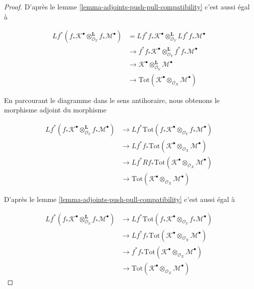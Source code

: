 {\begin{proof}
D'après le lemme \ref{lemma-adjoints-push-pull-compatibility} c'est aussi égal à

\begin{align*}
Lf^*(f_*\mathcal{K}^\bullet
\otimes_{\mathcal{O}_Y}^\mathbf{L}
f_*\mathcal{M}^\bullet)
& =
Lf^*f_*\mathcal{K}^\bullet
\otimes_{\mathcal{O}_Y}^\mathbf{L}
Lf^*f_*\mathcal{M}^\bullet \\
& \to
f^*f_*\mathcal{K}^\bullet
\otimes_{\mathcal{O}_Y}^\mathbf{L}
f^*f_*\mathcal{M}^\bullet \\
& \to
\mathcal{K}^\bullet
\otimes_{\mathcal{O}_Y}^\mathbf{L}
\mathcal{M}^\bullet \\
& \to
\text{Tot}(\mathcal{K}^\bullet
\otimes_{\mathcal{O}_X}
\mathcal{M}^\bullet)
\end{align*}

En parcourant le diagramme dans le sens antihoraire, nous obtenons le morphisme adjoint du morphisme

\begin{align*}
Lf^*(f_*\mathcal{K}^\bullet
\otimes_{\mathcal{O}_Y}^\mathbf{L}
f_*\mathcal{M}^\bullet)
& \to
Lf^*\text{Tot}(
f_*\mathcal{K}^\bullet
\otimes_{\mathcal{O}_Y}
f_*\mathcal{M}^\bullet) \\
& \to
Lf^*f_*\text{Tot}(\mathcal{K}^\bullet
\otimes_{\mathcal{O}_X}
\mathcal{M}^\bullet) \\
& \to
Lf^*Rf_*\text{Tot}(\mathcal{K}^\bullet
\otimes_{\mathcal{O}_X}
\mathcal{M}^\bullet) \\
& \to
\text{Tot}(\mathcal{K}^\bullet
\otimes_{\mathcal{O}_X}
\mathcal{M}^\bullet)
\end{align*}

D'après le lemme \ref{lemma-adjoints-push-pull-compatibility} c'est aussi égal à

\begin{align*}
Lf^*(f_*\mathcal{K}^\bullet
\otimes_{\mathcal{O}_Y}^\mathbf{L}
f_*\mathcal{M}^\bullet)
& \to
Lf^*\text{Tot}(
f_*\mathcal{K}^\bullet
\otimes_{\mathcal{O}_Y}
f_*\mathcal{M}^\bullet) \\
& \to
Lf^*f_*\text{Tot}(\mathcal{K}^\bullet
\otimes_{\mathcal{O}_X}
\mathcal{M}^\bullet) \\
& \to
f^*f_*\text{Tot}(\mathcal{K}^\bullet
\otimes_{\mathcal{O}_X}
\mathcal{M}^\bullet) \\
& \to
\text{Tot}(\mathcal{K}^\bullet
\otimes_{\mathcal{O}_X}
\mathcal{M}^\bullet)
\end{align*}


\end{proof}}
